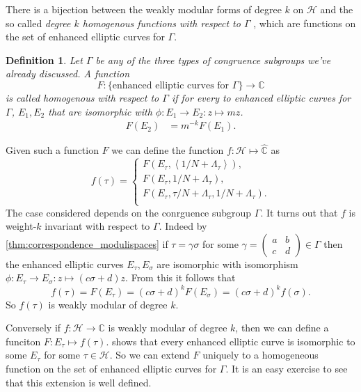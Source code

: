 \documentclass[a4paper]{article}
\theoremstyle{theoremdd}
\theoremstyle{definitiondd}
\newtheorem{definition}[theorem]{Definition}
\theoremstyle{remarkdd}
\newcommand{\C}{\mathbb{C}}
\begin{document}
There is a bijection between the weakly modular forms of degree $k$ on $\mathcal{H}$ and the so called  \emph{degree $k$ homogenous functions with respect to $\Gamma$ }, which are functions on the set of enhanced elliptic curves for $\Gamma$. 
\begin{definition}
	Let $\Gamma$ be any of the three types of congruence subgroups we've already discussed. 
	A function \[
	F: \{\text{enhanced elliptic curves for $\Gamma$}\} \to \C
	\]
	is called \emph{homogenous with respect to $\Gamma$} if for every to enhanced elliptic curves for $\Gamma$, $E_1, E_2$ that are isomorphic with $\phi:E_1 \to E_2: z\mapsto m z $.
		\begin{align*}
			F\left(E_2\right) &= m^{-k}F\left(E_1\right) 
		.\end{align*}
\end{definition}
Given such a function $F$ we can define the function $f: \mathcal{H} \mapsto  \hat{\C}$  as \[
	f(\tau) = \begin{cases}
		F(E_\tau, \left<1 / N + \Lambda_\tau\right>), \\
		F(E_\tau, 1 / N + \Lambda_\tau), \\
		F(E_\tau, \tau / N + \Lambda_\tau, 1 / N + \Lambda_\tau). \\
	\end{cases}
\] 
The case considered depends on the conrguence subgroup $\Gamma$.
It turns out that  $f$ is weight-$k$ invariant with respect to $\Gamma$. Indeed by \cref{thm:correspondence_modulispaces} if $\tau = \gamma \sigma$ for some  $\gamma = \begin{pmatrix} a & b \\ c & d \end{pmatrix}  \in \Gamma$ then the enhanced elliptic curves  $E_\tau, E_\sigma$ are isomorphic with isomorphism $\phi: E_\tau \to E_\sigma: z \mapsto (c \sigma + d) z$.
From this it follows that \[
	f(\tau) = F(E_\tau) = (c \sigma + d)^{k}F(E_\sigma) = (c \sigma + d)^{k}f(\sigma)
.\]
So $f(\tau )$ is weakly modular of degree $k$.

Conversely if $f: \mathcal{H}  \to \C$ is weakly modular of degree $k$, then we can define a funciton $F: E_\tau\mapsto f(\tau)$. 
 shows that every enhanced elliptic curve is isomorphic to some $E_\tau$ for some $\tau \in \mathcal{H} $. So we can extend $F$ uniquely to a homogeneous function on the set of enhanced elliptic curves for  $\Gamma$. 
It is an easy exercise to see that this extension is well defined. 
\end{document}

